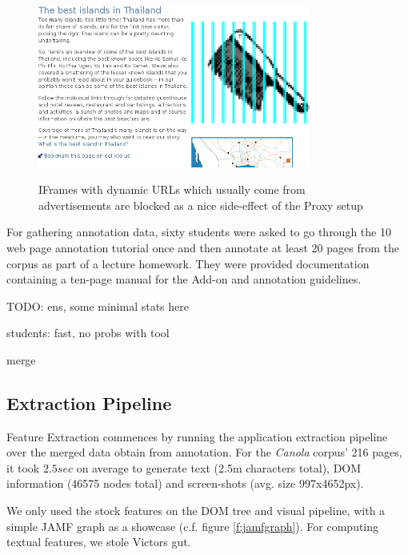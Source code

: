 \begin{figure}
	{\includegraphics[width=0.8\textwidth]{add}}
\caption{\label{f:iframes}IFrames with dynamic URLs which usually come from advertisements are blocked as a nice side-effect of the Proxy setup}
\end{figure}

For gathering annotation data, sixty students were asked to go through the 10 web page annotation tutorial once and then annotate at least 20 pages from the corpus as part of a lecture homework.
They were provided documentation containing a ten-page manual for the Add-on and annotation guidelines.

TODO: ens, some minimal stats here

students: fast, no probs with tool

merge

\subsection{Extraction Pipeline}

Feature Extraction commences by running the {\KrdWrd} application extraction pipeline over the merged data obtain from annotation. 
For the \textit{Canola} corpus' 216 pages, it took $2.5sec$ on average to generate text (2.5m characters total), DOM information (46575 nodes total) and screen-shots (avg. size 997x4652px).

We only used the stock {\KrdWrd} features on the DOM tree and visual pipeline, with a simple JAMF graph as a showcase (c.f. figure \ref{f:jamfgraph}).
For computing textual features, we stole Victors gut.

